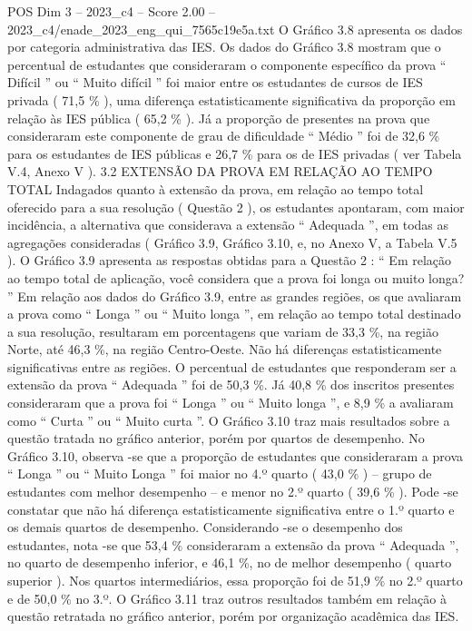 \begin{textsample}{POS Dim 3 – 2023\_c4 – Score 2.00 – 2023\_c4/enade\_2023\_eng\_qui\_7565c19e5a.txt}
O Gráfico 3.8 apresenta os dados por categoria administrativa das IES.
Os dados do Gráfico 3.8 mostram que o percentual de estudantes que consideraram o componente específico da prova “ Difícil ” ou “ Muito difícil ” foi maior entre os estudantes de cursos de IES privada ( 71,5 \% ), uma diferença estatisticamente significativa da proporção em relação às IES pública ( 65,2 \% ).
Já a proporção de presentes na prova que consideraram este componente de grau de dificuldade “ Médio ” foi de 32,6 \% para os estudantes de IES públicas e 26,7 \% para os de IES privadas ( ver Tabela V.4, Anexo V ). 3.2 EXTENSÃO DA PROVA EM RELAÇÃO AO TEMPO TOTAL Indagados quanto à extensão da prova, em relação ao tempo total oferecido para a sua resolução ( Questão 2 ), os estudantes apontaram, com maior incidência, a alternativa que considerava a extensão “ Adequada ”, em todas as agregações consideradas ( Gráfico 3.9, Gráfico 3.10, e, no Anexo V, a Tabela V.5 ).
O Gráfico 3.9 apresenta as respostas obtidas para a Questão 2 : “ Em relação ao tempo total de aplicação, você considera que a prova foi longa ou muito longa? ” Em relação aos dados do Gráfico 3.9, entre as grandes regiões, os que avaliaram a prova como “ Longa ” ou “ Muito longa ”, em relação ao tempo total destinado a sua resolução, resultaram em porcentagens que variam de 33,3 \%, na região Norte, até 46,3 \%, na região Centro-Oeste.
Não há diferenças estatisticamente significativas entre as regiões.
O percentual de estudantes que responderam ser a extensão da prova “ Adequada ” foi de 50,3 \%.
Já 40,8 \% dos inscritos presentes consideraram que a prova foi “ Longa ” ou “ Muito longa ”, e 8,9 \% a avaliaram como “ Curta ” ou “ Muito curta ”.
O Gráfico 3.10 traz mais resultados sobre a questão tratada no gráfico anterior, porém por quartos de desempenho.
No Gráfico 3.10, observa -se que a proporção de estudantes que consideraram a prova “ Longa ” ou “ Muito Longa ” foi maior no 4.º quarto ( 43,0 \% ) – grupo de estudantes com melhor desempenho – e menor no 2.º quarto ( 39,6 \% ).
Pode -se constatar que não há diferença estatisticamente significativa entre o 1.º quarto e os demais quartos de desempenho.
Considerando -se o desempenho dos estudantes, nota -se que 53,4 \% consideraram a extensão da prova “ Adequada ”, no quarto de desempenho inferior, e 46,1 \%, no de melhor desempenho ( quarto superior ).
Nos quartos intermediários, essa proporção foi de 51,9 \% no 2.º quarto e de 50,0 \% no 3.º.
O Gráfico 3.11 traz outros resultados também em relação à questão retratada no gráfico anterior, porém por organização acadêmica das IES.

\end{textsample}
